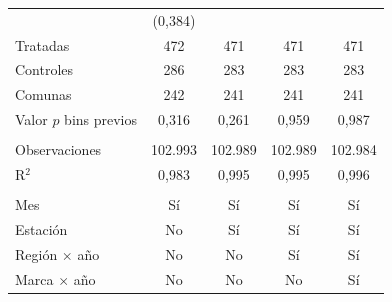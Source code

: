 \begin{tabular}{lcccc}
                          & (0{,}384)        &                &                &   \\   
   Tratadas               & 472            & 471            & 471            & 471\\  
   Controles              & 286            & 283            & 283            & 283\\  
   Comunas                & 242            & 241            & 241            & 241\\  
   Valor $p$ bins previos & 0{,}316          & 0{,}261          & 0{,}959          & 0{,}987\\  
    \\
   Observaciones          & 102.993        & 102.989        & 102.989        & 102.984\\  
   R$^2$                  & 0{,}983          & 0{,}995          & 0{,}995          & 0{,}996\\  
    \\
   Mes                    & Sí             & Sí             & Sí             & Sí\\  
   Estación               & No             & Sí             & Sí             & Sí\\  
   Región $\times$ año    & No             & No             & Sí             & Sí\\  
   Marca $\times$ año     & No             & No             & No             & Sí\\  
   \bottomrule
\end{tabular}
\par\endgroup
